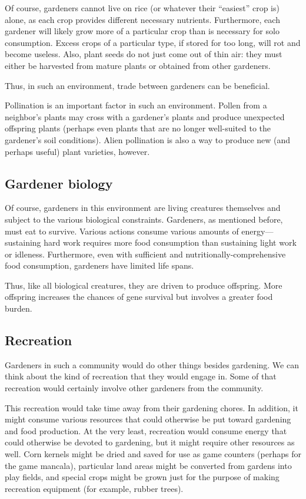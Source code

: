 \documentclass[12pt]{article}
\begin{document}
Of course, gardeners cannot live on rice (or whatever their ``easiest'' crop is) alone, as each crop provides different necessary nutrients.
Furthermore, each gardener will likely grow more of a particular crop than is necessary for solo consumption.
Excess crops of a particular type, if stored for too long, will rot and become useless. 
Also, plant seeds do not just come out of thin air:  they must either be harvested from mature plants or obtained from other gardeners.

Thus, in such an environment, trade between gardeners can be beneficial.

Pollination is an important factor in such an environment.
Pollen from a neighbor's plants may cross with a gardener's plants and produce unexpected offspring plants (perhaps even plants that are no longer well-suited to the gardener's soil conditions).
Alien pollination is also a way to produce new (and perhaps useful) plant varieties, however.

\subsection{Gardener biology}

Of course, gardeners in this environment are living creatures themselves and subject to the various biological constraints.
Gardeners, as mentioned before, must eat to survive.
Various actions consume various amounts of energy---sustaining hard work requires more food consumption than sustaining light work or idleness.
Furthermore, even with sufficient and nutritionally-comprehensive food consumption, gardeners have limited life spans.

Thus, like all biological creatures, they are driven to produce offspring.
More offspring increases the chances of gene survival but involves a greater food burden.


\subsection{Recreation}

Gardeners in such a community would do other things besides gardening.
We can think about the kind of recreation that they would engage in.
Some of that recreation would certainly involve other gardeners from the community.

This recreation would take time away from their gardening chores.
In addition, it might consume various resources that could otherwise be put toward gardening and food production.
At the very least, recreation would consume energy that could otherwise be devoted to gardening, but it might require other resources as well.
Corn kernels might be dried and saved for use as game counters (perhaps for the game mancala), particular land areas might be converted from gardens into play fields, and special crops might be grown just for the purpose of making recreation equipment (for example, rubber trees).
\end{document}
